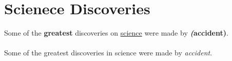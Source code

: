 \documentclass{article}
\begin{document}
	\section{Scienece Discoveries}
	Some of the \textbf{greatest}
	discoveries on \underline{science}
	were made by \textbf{\textit(accident)}.
	
	\paragraph{}
	Some of the greatest discoveries in science were made by \emph{accident}.
	
\end{document}
